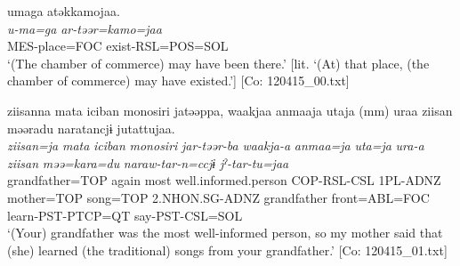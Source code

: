 \ex \label{ex:9.9d} %
      \glll  umaga  atəkkamojaa.\\
      \textit{u-ma=ga}  \textit{ar-təər=kamo=jaa}\\
      MES-place=FOC  exist-RSL=POS=SOL\\
      \glt       ‘(The chamber of commerce) may have been there.’ [lit. ‘(At) that place, (the chamber of commerce) may have existed.’] [Co: 120415\_00.txt]

\ex \label{9.9e} %
      \glll ziisanna  mata  {\textbar}iciban  monosiri{\textbar}  jatəəppa,  waakjaa  anmaaja  utaja  (mm)  uraa  ziisan  məəradu  naratancjɨ  jutattujaa.\\
      \textit{ziisan=ja}  \textit{mata}  \textit{iciban}  \textit{monosiri}  \textit{jar-təər{}-ba}  \textit{waakja-a}  \textit{anmaa=ja}  \textit{uta=ja}    \textit{ura-a}   \textit{ziisan} \textit{məə=kara=du}  \textit{naraw-tar-n=ccjɨ}  \textit{jˀ-tar-tu=jaa}\\
      grandfather=TOP  again  most  well.informed.person  COP-RSL-CSL  1PL-ADNZ  mother=TOP  song=TOP    2.NHON.SG-ADNZ   grandfather  front=ABL=FOC  learn-PST-PTCP=QT  say-PST-CSL=SOL\\      
      \glt  ‘(Your) grandfather was the most well-informed person, so my mother said that (she) learned (the traditional) songs from your grandfather.’ [Co: 120415\_01.txt]
    \z
\z

